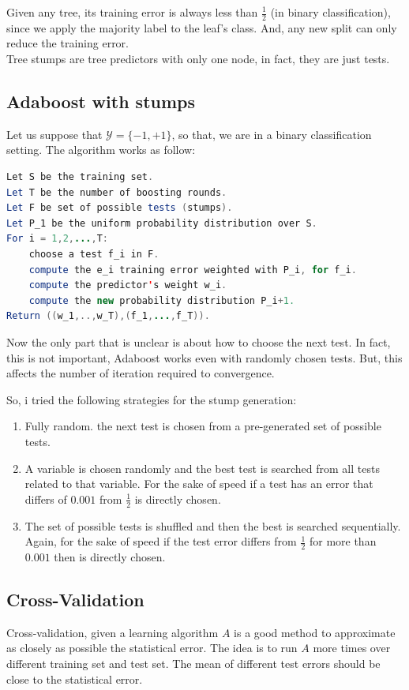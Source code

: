 \documentclass{article}
\begin{document}
Given any tree, its training error is always less than $\frac{1}{2}$ (in binary classification), 
since we apply the majority label to the leaf's class.
And, any new split can only reduce the training error.\\

Tree stumps are tree predictors with only one node, in fact, they are just tests.

\subsection{Adaboost with stumps}
Let us suppose that $\mathcal{Y} = \{-1,+1\}$, so that, we are in a binary classification setting.
The algorithm works as follow:

\begin{lstlisting}[language=Java]
Let S be the training set.
Let T be the number of boosting rounds.
Let F be set of possible tests (stumps).
Let P_1 be the uniform probability distribution over S.
For i = 1,2,...,T:
	choose a test f_i in F.
	compute the e_i training error weighted with P_i, for f_i.
	compute the predictor's weight w_i.
	compute the new probability distribution P_i+1.
Return ((w_1,..,w_T),(f_1,...,f_T)).
\end{lstlisting}

Now the only part that is unclear is about how to choose the next test.
In fact, this is not important, Adaboost works even with randomly chosen tests. But, this affects the number of iteration
required to convergence.

So, i tried the following strategies for the stump generation:
\begin{enumerate}
	\item Fully random. the next test is chosen from a pre-generated set of possible tests.
	\item A variable is chosen randomly and the best test is searched from all tests related to that variable.
	For the sake of speed if a test has an error that differs of $0.001$ from $\frac{1}{2}$ is directly chosen.
	\item The set of possible tests is shuffled and then the best is searched sequentially. Again, for the sake
    of speed if the test error differs from $\frac{1}{2}$ for more than $0.001$ then is directly chosen.
\end{enumerate}

\subsection{Cross-Validation}
Cross-validation, given a learning algorithm $A$ is a good method to approximate as closely as possible the statistical error. The idea is to run $A$ more times over different
training set and test set. The mean of different test errors should be close to the statistical error.
\end{document}
